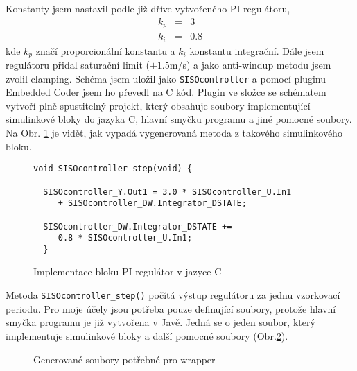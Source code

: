 \documentclass[thesis=M,czech,hidelinks]{FITthesis}[2012/06/26]
\begin{document}
Konstanty jsem nastavil podle již dříve vytvořeného PI regulátoru,
\begin{eqnarray}
\label{konstanty}
k_p &=& 3 \\ \nonumber
k_i &=& 0.8
\end{eqnarray}
kde $k_p$ značí proporcionální konstantu a $k_i$ konstantu integrační. Dále jsem regulátoru přidal saturační limit ($\pm1.5$m/s) a jako anti-windup metodu jsem zvolil clamping. %
 Schéma jsem uložil jako \texttt{SISOcontroller}  a pomocí pluginu Embedded Coder jsem ho převedl na C kód. Plugin ve složce se schématem vytvoří plně spustitelný projekt, který obsahuje soubory implementující simulinkové bloky do jazyka C, hlavní smyčku programu a jiné pomocné soubory. Na Obr. \ref{fig:ctrl.c} je vidět, jak vypadá vygenerovaná metoda z takového simulinkového bloku.
\begin{figure}[h]               
  \begin{verbatim}
void SISOcontroller_step(void) {
  
  SISOcontroller_Y.Out1 = 3.0 * SISOcontroller_U.In1 
     + SISOcontroller_DW.Integrator_DSTATE;
    
  SISOcontroller_DW.Integrator_DSTATE += 
     0.8 * SISOcontroller_U.In1;
  }
  \end{verbatim}      
  \caption{Implementace bloku PI regulátor v jazyce C}
  \label{fig:ctrl.c}
\end{figure}

Metoda \texttt{SISOcontroller\_step()} počítá výstup regulátoru za jednu vzorkovací periodu. Pro moje účely jsou potřeba pouze definující soubory, protože hlavní smyčka programu je již vytvořena v Javě. Jedná se o jeden soubor, který implementuje simulinkové bloky a další pomocné soubory (Obr.\ref{fig:sisogen}).
\begin{figure}[h]
        \centering
        \caption{Generované soubory potřebné pro wrapper}
        \label{fig:sisogen}
\end{figure}
\end{document}
